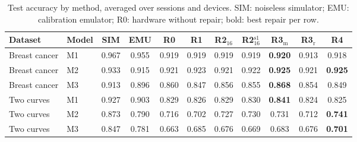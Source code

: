 \begin{table}[t]
\centering
\caption{Test accuracy by method, averaged over sessions and devices. SIM: noiseless simulator; EMU: calibration emulator; R0: hardware without repair; bold: best repair per row.}
\label{tab:accuracy}
\footnotesize
\setlength{\tabcolsep}{3.5pt}
\begin{tabular}{llccccccccc}
\toprule
Dataset & Model & SIM & EMU & R0 & R1 & R2$_{16}$ & R2$_{16}^{\mathrm{s1}}$ & R3$_{\mathrm{m}}$ & R3$_{\mathrm{r}}$ & R4 \\
\midrule
Breast cancer & M1 & 0.967 & 0.955 & 0.919 & 0.919 & 0.919 & 0.919 & \textbf{0.920} & 0.913 & 0.918 \\
Breast cancer & M2 & 0.933 & 0.915 & 0.921 & 0.923 & 0.921 & 0.922 & \textbf{0.925} & 0.921 & \textbf{0.925} \\
Breast cancer & M3 & 0.913 & 0.896 & 0.860 & 0.847 & 0.856 & 0.855 & \textbf{0.868} & 0.854 & 0.849 \\
Two curves & M1 & 0.927 & 0.903 & 0.829 & 0.826 & 0.829 & 0.830 & \textbf{0.841} & 0.824 & 0.825 \\
Two curves & M2 & 0.873 & 0.790 & 0.716 & 0.702 & 0.727 & 0.730 & 0.731 & 0.712 & \textbf{0.741} \\
Two curves & M3 & 0.847 & 0.781 & 0.663 & 0.685 & 0.676 & 0.669 & 0.683 & 0.676 & \textbf{0.701} \\
\bottomrule
\end{tabular}
\end{table}
